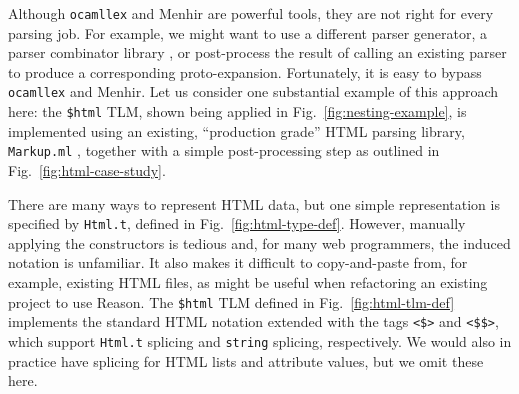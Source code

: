 \documentclass[acmsmall]{acmart}
\newcommand{\li}[1]{\lstinline[basicstyle=\ttfamily\fontsize{9pt}{1em}\selectfont]{#1}}
\begin{document}
Although \li{ocamllex} and Menhir are powerful tools, they are not right for every parsing job. For example, we might want to use a different parser generator, a parser combinator library \cite{Hutton1992d}, or post-process the result of calling an existing parser to produce a corresponding proto-expansion. Fortunately, it is easy to bypass \li{ocamllex} and Menhir. 
Let us consider one substantial example of this approach here: the \li{$html} TLM, shown being applied in Fig.~\ref{fig:nesting-example}, is implemented using an existing, ``production grade'' HTML parsing library, \li{Markup.ml} \cite{markupml}, together with a simple post-processing step as outlined in Fig.~\ref{fig:html-case-study}. 

There are many ways to represent HTML data, but one simple representation is specified by \li{Html.t}, defined in Fig.~\ref{fig:html-type-def}. However, manually applying the constructors is tedious and, for many web programmers, the induced notation is unfamiliar. It also makes it difficult to copy-and-paste from, for example, existing HTML files, as might be useful when refactoring an existing project to use Reason. 
The \li{$html} TLM defined in Fig.~\ref{fig:html-tlm-def} implements the standard HTML notation extended with the tags \li{<$>} and \li{<$$>}, which support \li{Html.t} splicing and \li{string} splicing, respectively. 
{We would also in practice have splicing for HTML lists and attribute values, but we omit these here.}
\end{document}
